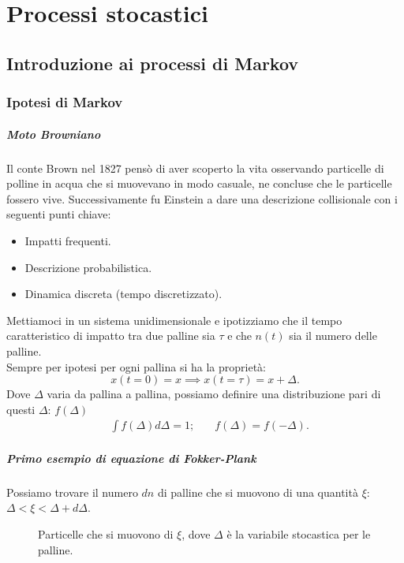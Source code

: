 \chapter{Processi stocastici}
\section{Introduzione ai processi di Markov}%
\label{sub:Lezione 1}
\mylocaltoc
\subsection{Ipotesi di Markov}%
\paragraph{Moto Browniano}
Il conte Brown nel 1827 pensò di aver scoperto la vita osservando particelle di polline in acqua che si muovevano in modo casuale, ne concluse che le particelle fossero vive. Successivamente fu Einstein a dare una descrizione collisionale con i seguenti punti chiave:
\begin{itemize}
    \item Impatti frequenti.
    \item Descrizione probabilistica.
    \item Dinamica discreta (tempo discretizzato).
\end{itemize}
Mettiamoci in un sistema unidimensionale e ipotizziamo che il tempo caratteristico di impatto tra due palline sia $\tau$ e che $n(t)$ sia il numero delle palline.\\
Sempre per ipotesi per ogni pallina si ha la proprietà:
\[
    x(t=0) = x \implies  x(t=\tau) = x + \Delta
.\] 
Dove $\Delta$ varia da pallina a pallina, possiamo definire una distribuzione pari di questi $\Delta$: $f(\Delta)$
\[\begin{aligned}
    &\int f(\Delta) d\Delta = 1; \quad &f(\Delta) = f(-\Delta) 
.\end{aligned}\]
\paragraph{Primo esempio di equazione di Fokker-Plank}%
Possiamo trovare il numero $dn$ di palline che si muovono di una quantità $\xi$: $\Delta < \xi < \Delta  + d\Delta$.
\begin{figure}[H]
    \centering
    \caption{\scriptsize Particelle che si muovono di $\xi$, dove $\Delta$ è la variabile stocastica per le palline.}
    \label{fig:1-brown}
\end{figure}
\noindent

